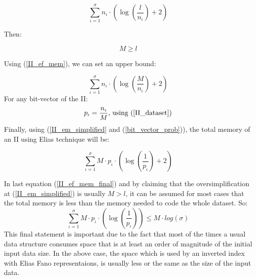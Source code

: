 \begin{equation} \label{II_ef_mem}
\sum_{\iota = 1}^{\sigma} n_{\iota}\cdot ( \log(\frac{l}{n_{\iota}}) + 2 )
\end{equation}

Then:

\begin{equation} \label{II_dataset}
	M \geq l 
\end{equation} 

Using (\ref{II_ef_mem}), we can set an upper bound:

\begin{equation}\label{II_em_simplified}
	\sum_{\iota = 1}^{\sigma} n_{\iota}\cdot ( \log(\frac{M}{n_{\iota}}) + 2 )
\end{equation}
For any bit-vector of the II:
\begin{equation} \label{bit_vector_prob}
	p_{\iota} = \frac{n_{\iota}}{M} \textnormal{, using (\ref{II_dataset})}
\end{equation}
Finally, using (\ref{II_em_simplified} and (\ref{bit_vector_prob})), the total memory of an II using Elias technique will be:

\begin{equation} \label{II_ef_mem_final}
	\sum_{\iota = 1}^{\sigma} M\cdot p_{\iota}\cdot ( \log(\frac{1}{p_{\iota}}) + 2 )
\end{equation}

In last equation (\ref{II_ef_mem_final}) and by claiming that the oversimplification at (\ref{II_em_simplified}) is usually \(M > l \), it can be assumed for most cases that the total memory is less than the memory needed to code the whole dataset. So:
\begin{equation}
	\sum_{\iota = 1}^{\sigma} M\cdot p_{\iota}\cdot ( \log(\frac{1}{p_{\iota}})) \leq M\cdot log(\sigma)
\end{equation}
This final statement is important due to the fact that most of the times a usual data structure consumes space that is at least an order of magnitude of the initial input data size. In the above case, the space which is used by an inverted index with Elias Fano representaions, is usually less or the same as the size of the input data.
